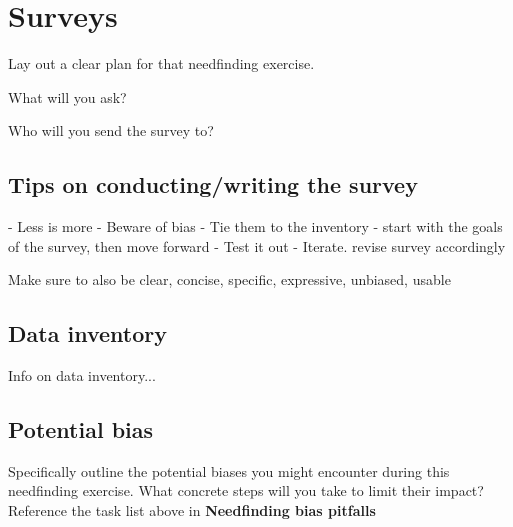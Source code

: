 \section{Surveys}
Lay out a clear plan for that needfinding exercise.

What will you ask?

Who will you send the survey to?

\subsection{Tips on conducting/writing the survey}
- Less is more
- Beware of bias
- Tie them to the inventory
  - start with the goals of the survey, then move forward
- Test it out
- Iterate. revise survey accordingly

Make sure to also be clear, concise, specific, expressive, unbiased, usable

\subsection{Data inventory}
Info on data inventory...

\subsection{Potential bias}
Specifically outline the potential biases you might encounter during this needfinding exercise. What concrete steps will you take to limit their impact? Reference the task list above in \textbf{Needfinding bias pitfalls}


